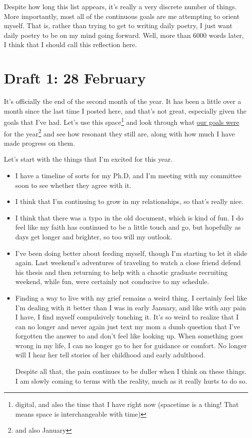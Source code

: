 \documentclass[12pt]{article}[titlepage]
\renewcommand{\,}{\textsuperscript{,}}
\begin{document}
Despite how long this list appears, it's really a very discrete number of things.  
More importantly, most all of the continuous goals are me attempting to orient myself.  
That is, rather than trying to get to writing daily poetry, I just want daily poetry to be on my mind going forward.  
Well, more than 6000 words later, I think that I should call this reflection here.

\section{Draft 1: 28 February}

It's officially the end of the second month of the year.  
It has been a little over a month since the last time I posted here, and that's not great, especially given the goals that I've had.  
Let's use this space\footnote{digital, and also the time that I have right now (spacetime is a thing! That means space is interchangeable with time)} and look through what \href{planning-2025.html}{our goals were} for the year\footnote{and also January} and see how resonant they still are, along with how much I have made progress on them.

Let's start with the things that I'm excited for this year.

\begin{itemize}  
\item I have a timeline of sorts for my Ph.D, and I'm meeting with my committee soon to see whether they agree with it.  
\item I think that I'm continuing to grow in my relationships, so that's really nice.  
\item I think that there was a typo in the old document, which is kind of fun. I do feel like my faith has continued to be a little touch and go, but hopefully as days get longer and brighter, so too will my outlook.  
\item I've been doing better about feeding myself, though I'm starting to let it slide again. Last weekend's adventures of traveling to watch a close friend defend his thesis and then returning to help with a chaotic graduate recruiting weekend, while fun, were certainly not conducive to my schedule.  
\item Finding a way to live with my grief remains a weird thing.  
I certainly feel like I'm dealing with it better than I was in early January, and like with any pain I have, I find myself compulsively touching it.  
It's so weird to realize that I can no longer and never again just text my mom a dumb question that I've forgotten the answer to and don't feel like looking up.  
When something goes wrong in my life, I can no longer go to her for guidance or comfort.  
No longer will I hear her tell stories of her childhood and early adulthood.

Despite all that, the pain continues to be duller when I think on these things.  
I am slowly coming to terms with the reality, much as it really hurts to do so.  
\end{itemize}
\end{document}
